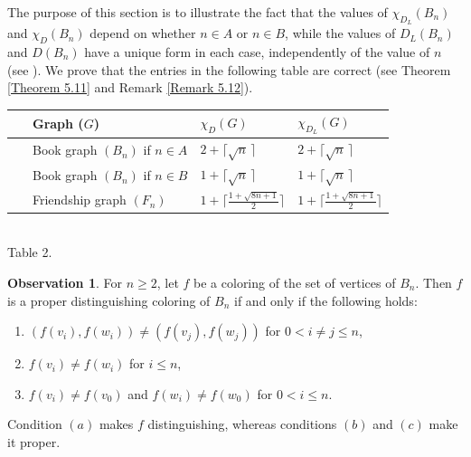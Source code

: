 \documentclass[12pt,reqno,a4paper]{amsart}
\theoremstyle{definition}
\newtheorem{observation}[defn]{Observation}
\begin{document}
The purpose of this section is to illustrate
the fact that the values of $\chi_{D_L}(B_n)$ and $\chi_{D}(B_n)$ depend on whether $n\in A$ or $n\in B$, while the values of $D_L(B_n)$ and $D(B_n)$ have a unique form in each case, independently of the value of $n$ (see \cite{AS, AS2017}).
We prove that the entries in the following table are correct (see Theorem \ref{Theorem 5.11} and Remark \ref{Remark 5.12}).
    
\begin{center}
      \begin{tabular}{|ll|l|l|}
        \hline
             & Graph ($G$) & $\chi_{D}(G)$ &$\chi_{D_L}(G)$\\
             \hline\hline
             & Book graph $(B_{n})$ if $n\in A$ & $2+ \lceil\sqrt{n}\,\rceil$ & $2+ \lceil\sqrt{n}\,\rceil$ \\
             
             & Book graph $(B_{n})$ if $n\in B$ & $1+ \lceil\sqrt{n}\,\rceil$ & $1+ \lceil\sqrt{n}\,\rceil$ \\\
             
             & Friendship graph $(F_{n})$  &$1+\lceil\frac{1+\sqrt{8n+1}}{2}\rceil$ & $1+\lceil\frac{1+\sqrt{8n+1}}{2}\rceil$\\
             
        \hline
        \end{tabular}
        \\
       Table 2. 
        \label{tab:my_label}
    \end{center}  

\begin{observation}\label{Observation 5.6}
    For $n\geq 2$, let $f$ be a coloring of the set of vertices of $B_n$. Then $f$ is a proper distinguishing coloring of $B_n$ if and only if the following holds:
    \begin{enumerate}
        \item[$(a)$] $(f(v_i), f(w_i))\neq (f(v_j), f(w_j)) $ for $0< i\neq j\leq n$,
        \item[$(b)$] $f(v_i)\neq f(w_i)$ for $i\leq n$,
        \item[$(c)$] $f(v_i)\neq f(v_0)$ and $f(w_i)\neq f(w_0)$ for $0<i\leq n$. 
    \end{enumerate}
    Condition $(a)$ makes $f$ distinguishing, whereas conditions $(b)$ and $(c)$ make it proper.
\end{observation}
\end{document}
